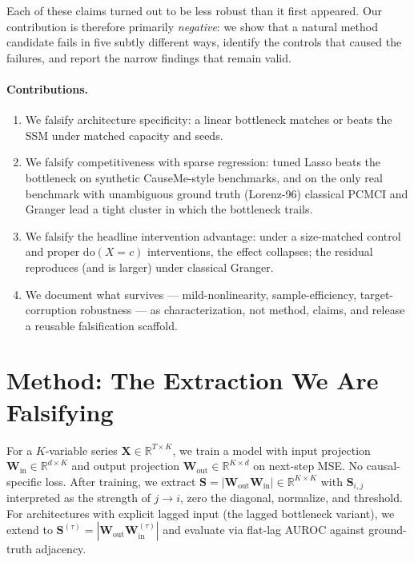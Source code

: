 \documentclass{article}
\begin{document}
Each of these claims turned out to be less robust than it first appeared.
Our contribution is therefore primarily \emph{negative}: we show that
a natural method candidate fails in five subtly different ways,
identify the controls that caused the failures, and report the narrow
findings that remain valid.

\paragraph{Contributions.}
\begin{enumerate}[leftmargin=1.5em, topsep=0pt, itemsep=0pt]
  \item We falsify architecture specificity: a linear bottleneck matches
  or beats the SSM under matched capacity and seeds.
  \item We falsify competitiveness with sparse regression: tuned Lasso
  beats the bottleneck on synthetic CauseMe-style benchmarks, and on
  the only real benchmark with unambiguous ground truth (Lorenz-96)
  classical PCMCI and Granger lead a tight cluster in which the
  bottleneck trails.
  \item We falsify the headline intervention advantage: under a
  size-matched control and proper $\text{do}(X = c)$ interventions, the
  effect collapses; the residual reproduces (and is larger) under
  classical Granger.
  \item We document what survives — mild-nonlinearity, sample-efficiency,
  target-corruption robustness — as characterization, not method, claims,
  and release a reusable falsification scaffold.
\end{enumerate}

\section{Method: The Extraction We Are Falsifying}
\label{sec:observation}

For a $K$-variable series $\mathbf{X} \in \mathbb{R}^{T \times K}$, we
train a model with input projection $\mathbf{W}_{\text{in}} \in
\mathbb{R}^{d \times K}$ and output projection $\mathbf{W}_{\text{out}}
\in \mathbb{R}^{K \times d}$ on next-step MSE. No causal-specific loss.
After training, we extract
$\mathbf{S} = |\mathbf{W}_{\text{out}} \mathbf{W}_{\text{in}}| \in
\mathbb{R}^{K \times K}$ with $\mathbf{S}_{i,j}$ interpreted as the
strength of $j \to i$, zero the diagonal, normalize, and threshold. For
architectures with explicit lagged input (the lagged bottleneck variant),
we extend to $\mathbf{S}^{(\tau)} = |\mathbf{W}_{\text{out}}
\mathbf{W}^{(\tau)}_{\text{in}}|$ and evaluate via flat-lag AUROC against
ground-truth adjacency.
\end{document}
